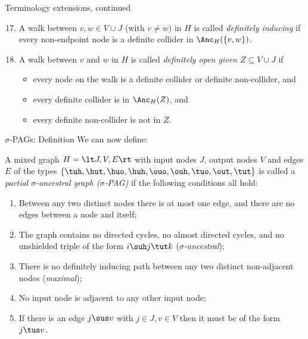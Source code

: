 \begin{frame}[t]{Terminology extensions, continued}
  \begin{Def}
  \begin{enumerate}
    \setcounter{enumi}{16}
    \item A walk between $v,w \in V \cup J$ (with $v \ne w$) in $H$ is called \emph{definitely inducing} if every non-endpoint node is a definite collider in $\Anc_H(\{v,w\})$.
    \item A walk between $v$ and $w$ in $H$ is called \emph{definitely open given $Z \subseteq V \cup J$} if
      \begin{itemize}
        \item every node on the walk is a definite collider or definite non-collider, and
        \item every definite collider is in $\Anc_H(Z)$, and
        \item every definite non-collider is not in $Z$.
      \end{itemize}
  \end{enumerate}
\end{Def}
\end{frame}

\begin{frame}{$\sigma$-PAGs: Definition}
We can now define:
\begin{Def}[\ref{def:sigmapag}]
  A mixed graph $H = \lt J,V,E\rt$ with input nodes $J$, output nodes $V$ and edges $E$ of the types $\{\tuh,\hut,\huo,\huh,\ouo,\ouh,\tuo,\out,\tut\}$ is called a \emph{partial $\sigma$-ancestral graph ($\sigma$-PAG)} if the following conditions all hold:
  \begin{enumerate}
    \item Between any two distinct nodes there is at most one edge, and there are no edges between a node and itself;
    \item The graph contains no directed cycles, no almost directed cycles, and no unshielded triple of the form $i \suh j \tut k$ (\emph{$\sigma$-ancestral});
    \item There is no definitely inducing path between any two distinct non-adjacent nodes (\emph{maximal});
    \item No input node is adjacent to any other input node;
    \item If there is an edge $j \sus v$ with $j \in J, v \in V$ then it must be of the form $j \tus v$.
  \end{enumerate}
\end{Def}
\end{frame}

